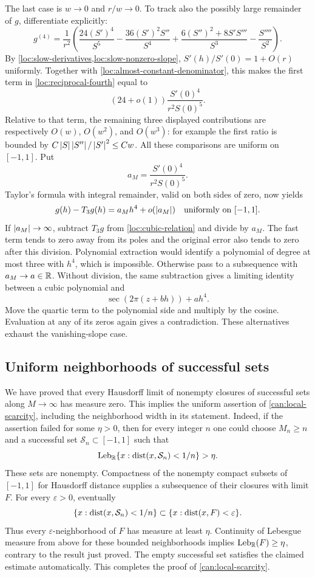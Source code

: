 The last case is $w\to0$ and $r/w\to0$. To track also the possibly
large remainder of $g$, differentiate explicitly:
\begin{equation}
 g^{(4)}=\frac1{r^2}\left(
 \frac{24(S')^4}{S^5}
 -\frac{36(S')^2S''}{S^4}
 +\frac{6(S'')^2+8S'S'''}{S^3}
 -\frac{S''''}{S^2}\right).
 \label{loc:reciprocal-fourth}
\end{equation}
By \cref{loc:slow-derivatives,loc:slow-nonzero-slope},
$S'(h)/S'(0)=1+O(r)$ uniformly. Together with
\cref{loc:almost-constant-denominator}, this makes the first term
in \cref{loc:reciprocal-fourth} equal to
\[
 (24+o(1))\frac{S'(0)^4}{r^2S(0)^5}.
\]
Relative to that term, the remaining three displayed contributions
are respectively $O(w)$, $O(w^2)$, and $O(w^3)$: for example the
first ratio is bounded by $C\left\lvert S\right\rvert\left\lvert S''\right\rvert/\left\lvert S'\right\rvert^2\le Cw$.
All these comparisons are uniform on $[-1,1]$. Put
\[
 a_M=\frac{S'(0)^4}{r^2S(0)^5}.
\]
Taylor's formula with integral remainder, valid on both sides of
zero, now yields
\begin{equation}
 g(h)-T_3g(h)=a_Mh^4+o(\left\lvert a_M\right\rvert)
 \quad\hbox{uniformly on }[-1,1].
 \label{loc:quartic-remainder}
\end{equation}
If $\left\lvert a_M\right\rvert\to\infty$, subtract $T_3g$ from
\cref{loc:cubic-relation} and divide by $a_M$. The fast term tends
to zero away from its poles and the original error also tends to
zero after this division. Polynomial extraction would identify a
polynomial of degree at most three with $h^4$, which is impossible.
Otherwise pass to a subsequence with $a_M\to a\in\mathbb{R}$.
Without division, the same subtraction gives a limiting identity
between a cubic polynomial and
\[
 \sec(2\pi(z+bh))+ah^4.
\]
Move the quartic term to the polynomial side and multiply by the
cosine. Evaluation at any of its zeros again gives a contradiction.
These alternatives exhaust the vanishing-slope case.

\subsection{Uniform neighborhoods of successful sets}

We have proved that every Hausdorff limit of nonempty closures of
successful sets along $M\to\infty$ has measure zero. This implies
the uniform assertion of \cref{can:local-scarcity}, including the
neighborhood width in its statement. Indeed, if the assertion failed
for some $\eta>0$, then for every integer $n$ one could choose
$M_n\ge n$ and a successful set $\mathcal S_n\subset[-1,1]$ such
that
\[
 \operatorname{Leb}_{\mathbb{R}}\{x:\operatorname{dist}(x,\mathcal S_n)<1/n\}>\eta.
\]
These sets are nonempty. Compactness of the nonempty compact subsets
of $[-1,1]$ for Hausdorff distance supplies a subsequence of their
closures with limit $F$. For every $\varepsilon>0$, eventually
\[
 \{x:\operatorname{dist}(x,\mathcal S_n)<1/n\}
 \subset\{x:\operatorname{dist}(x,F)<\varepsilon\}.
\]
Thus every $\varepsilon$-neighborhood of $F$ has measure at least
$\eta$. Continuity of Lebesgue measure from above for these bounded
neighborhoods implies $\operatorname{Leb}_{\mathbb{R}}(F)\ge\eta$,
contrary to the result just proved. The empty successful set satisfies
the claimed estimate automatically. This completes the proof of
\cref{can:local-scarcity}.
